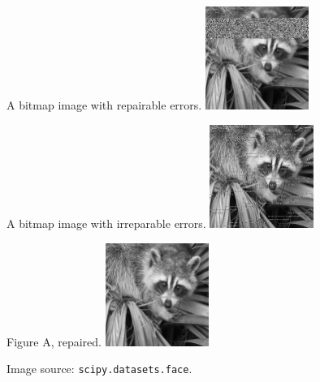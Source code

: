 \begin{figure}[H]
    \centering
    \begin{subcaptionbox}{A bitmap image with repairable errors.}
        {\includegraphics[width=0.3\textwidth]{face_2.png}}
    \end{subcaptionbox}
    \hfill
    \begin{subcaptionbox}{A bitmap image with irreparable errors.}
        {\includegraphics[width=0.3\textwidth]{face_3.png}}
    \end{subcaptionbox}
    \hfill
    \begin{subcaptionbox}{Figure A, repaired.}
        {\includegraphics[width=0.3\textwidth]{face_2_repaired.png}}
    \end{subcaptionbox}
    
    \caption{Image source: \texttt{scipy.datasets.face}.}
\end{figure}
